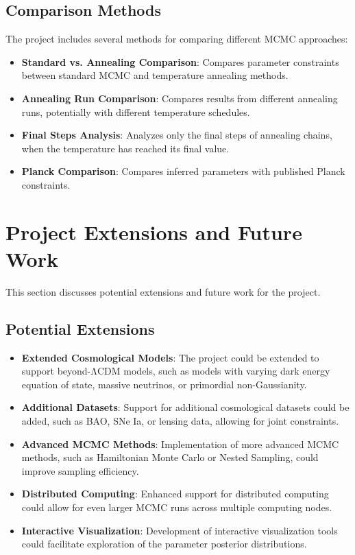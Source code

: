 \documentclass[11pt]{article}
\begin{document}
\subsection{Comparison Methods}

The project includes several methods for comparing different MCMC approaches:

\begin{itemize}
    \item \textbf{Standard vs. Annealing Comparison}: Compares parameter constraints between standard MCMC and temperature annealing methods.
    
    \item \textbf{Annealing Run Comparison}: Compares results from different annealing runs, potentially with different temperature schedules.
    
    \item \textbf{Final Steps Analysis}: Analyzes only the final steps of annealing chains, when the temperature has reached its final value.
    
    \item \textbf{Planck Comparison}: Compares inferred parameters with published Planck constraints.
\end{itemize}

\section{Project Extensions and Future Work}

This section discusses potential extensions and future work for the project.

\subsection{Potential Extensions}

\begin{itemize}
    \item \textbf{Extended Cosmological Models}: The project could be extended to support beyond-ΛCDM models, such as models with varying dark energy equation of state, massive neutrinos, or primordial non-Gaussianity.
    
    \item \textbf{Additional Datasets}: Support for additional cosmological datasets could be added, such as BAO, SNe Ia, or lensing data, allowing for joint constraints.
    
    \item \textbf{Advanced MCMC Methods}: Implementation of more advanced MCMC methods, such as Hamiltonian Monte Carlo or Nested Sampling, could improve sampling efficiency.
    
    \item \textbf{Distributed Computing}: Enhanced support for distributed computing could allow for even larger MCMC runs across multiple computing nodes.
    
    \item \textbf{Interactive Visualization}: Development of interactive visualization tools could facilitate exploration of the parameter posterior distributions.
\end{itemize}
\end{document}
